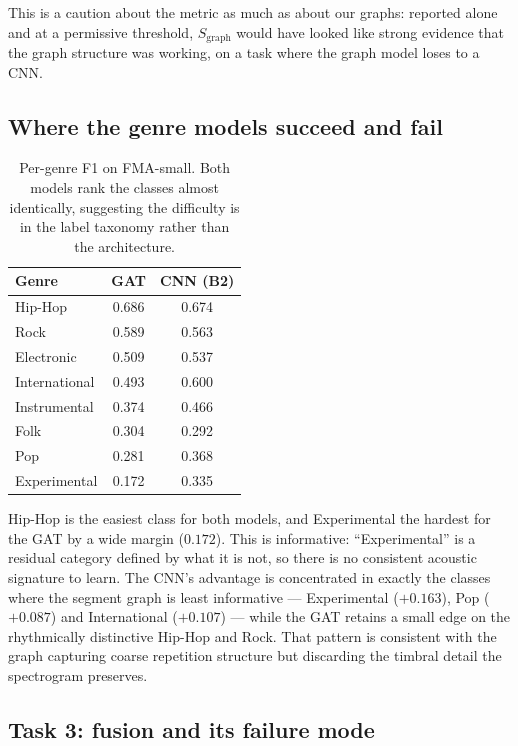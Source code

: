 \documentclass[conference]{IEEEtran}
\begin{document}
This is a caution about the metric as much as about our graphs: reported alone
and at a permissive threshold, $S_{\mathrm{graph}}$ would have looked like
strong evidence that the graph structure was working, on a task where the
graph model loses to a CNN.

\subsection{Where the genre models succeed and fail}

\begin{table}[H]
\centering\small
\caption{Per-genre F1 on FMA-small. Both models rank the classes almost
identically, suggesting the difficulty is in the label taxonomy rather than the
architecture.}
\begin{tabular}{lcc}
\toprule
Genre & GAT & CNN (B2) \\
\midrule
Hip-Hop & 0.686 & 0.674 \\
Rock & 0.589 & 0.563 \\
Electronic & 0.509 & 0.537 \\
International & 0.493 & 0.600 \\
Instrumental & 0.374 & 0.466 \\
Folk & 0.304 & 0.292 \\
Pop & 0.281 & 0.368 \\
Experimental & 0.172 & 0.335 \\
\bottomrule
\end{tabular}
\end{table}

\noindent Hip-Hop is the easiest class for both models, and Experimental the
hardest for the GAT by a wide margin ($0.172$). This is informative:
``Experimental'' is a residual category defined by what it is not, so there is
no consistent acoustic signature to learn. The CNN's advantage is concentrated
in exactly the classes where the segment graph is least informative ---
Experimental ($+0.163$), Pop ($+0.087$) and International ($+0.107$) --- while
the GAT retains a small edge on the rhythmically distinctive Hip-Hop and Rock.
That pattern is consistent with the graph capturing coarse repetition structure
but discarding the timbral detail the spectrogram preserves.

\subsection{Task 3: fusion and its failure mode}
\label{sec:t3results}
\end{document}
